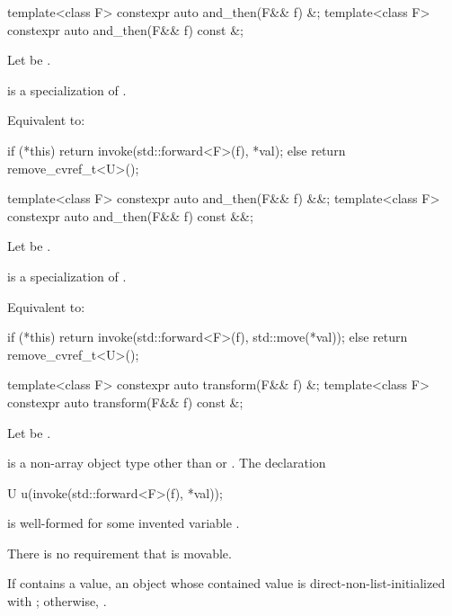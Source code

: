 \begin{itemdecl}
template<class F> constexpr auto and_then(F&& f) &;
template<class F> constexpr auto and_then(F&& f) const &;
\end{itemdecl}

\begin{itemdescr}
\pnum
Let  be .

\pnum
\mandates
{} is a specialization of .

\pnum
\effects
Equivalent to:
\begin{codeblock}
if (*this) {
  return invoke(std::forward<F>(f), *val);
} else {
  return remove_cvref_t<U>();
}
\end{codeblock}
\end{itemdescr}

\begin{itemdecl}
template<class F> constexpr auto and_then(F&& f) &&;
template<class F> constexpr auto and_then(F&& f) const &&;
\end{itemdecl}

\begin{itemdescr}
\pnum
Let  be .

\pnum
\mandates
{} is a specialization of .

\pnum
\effects
Equivalent to:
\begin{codeblock}
if (*this) {
  return invoke(std::forward<F>(f), std::move(*val));
} else {
  return remove_cvref_t<U>();
}
\end{codeblock}
\end{itemdescr}

\begin{itemdecl}
template<class F> constexpr auto transform(F&& f) &;
template<class F> constexpr auto transform(F&& f) const &;
\end{itemdecl}

\begin{itemdescr}
\pnum
Let  be .

\pnum
\mandates
{} is a non-array object type
other than  or .
The declaration
\begin{codeblock}
U u(invoke(std::forward<F>(f), *val));
\end{codeblock}
is well-formed for some invented variable .
\begin{note}
There is no requirement that  is movable.
\end{note}

\pnum
\returns
If  contains a value, an  object
whose contained value is direct-non-list-initialized with
;
otherwise, .
\end{itemdescr}

